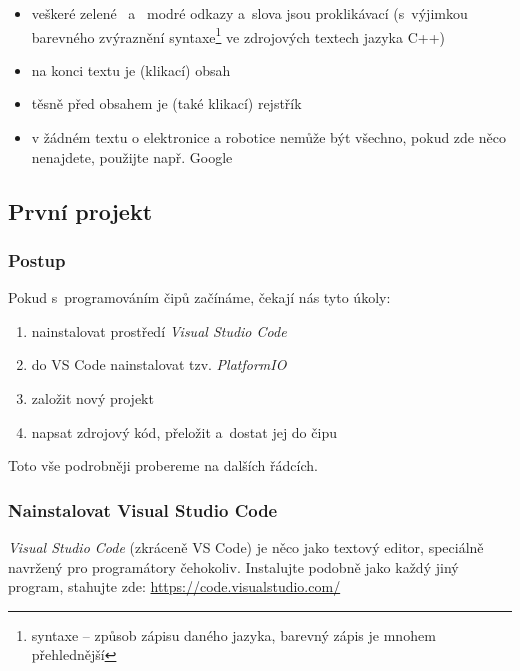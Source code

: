 \begin{itemize} 
\item veškeré \color{mygreen} zelené\color{black} \ a~\color{blue} modré \color{black} 
 \color{black} odkazy a~slova jsou proklikávací (s~výjimkou barevného zvýraznění 
syntaxe\footnote{syntaxe -- způsob zápisu daného jazyka, barevný zápis je mnohem přehlednější} ve zdrojových textech jazyka C++)
\item na konci textu je (klikací) obsah 
\item těsně před obsahem je (také klikací) rejstřík
\item v žádném textu o elektronice a robotice nemůže být všechno, pokud zde něco nenajdete, použijte např. Google
\end{itemize}

\subsection{První projekt}
 

 
\subsubsection*{Postup}

Pokud s~programováním čipů začínáme, čekají nás tyto úkoly:
\begin{enumerate}
\item  nainstalovat prostředí {\it Visual Studio Code}
\item  do VS Code nainstalovat tzv. {\it PlatformIO }
\item  založit nový projekt
\item  napsat zdrojový kód, přeložit a~dostat jej do čipu 
\end{enumerate}
Toto vše podrobněji probereme na dalších řádcích. 

\label{vsc} \subsubsection{Nainstalovat  Visual Studio Code} \label{vscode}

{\it Visual Studio Code}  (zkráceně VS Code) 
je něco jako textový editor, speciálně navržený pro programátory čehokoliv.
Instalujte podobně jako každý jiný program, stahujte zde: \url{https://code.visualstudio.com/}  


